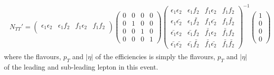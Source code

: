 \begin{align}
\begin{split}
N_{TT}'
=
\left( \begin{array}{cccc}
\epsilon_1 \epsilon_2 & \epsilon_1 f_2 & f_1 \epsilon_2 & f_1 f_2 \\
\end{array} \right)
\left( \begin{array}{cccc}
0 & 0 & 0 & 0 \\
0 & 1 & 0 & 0 \\
0 & 0 & 1 & 0 \\
0 & 0 & 0 & 1
\end{array} \right)
\left( \begin{array}{cccc}
\epsilon_1 \epsilon_2 & \epsilon_1 f_2 & f_1 \epsilon_2 & f_1 f_2 \\
\epsilon_1 \bar{\epsilon_2} & \epsilon_1 \bar{f_2} & f_1 \bar{\epsilon_2} & f_1 \bar{f_2} \\
\bar{\epsilon_1} \epsilon_2 & \bar{\epsilon_1} f_2 & \bar{f_1} \epsilon_2 & \bar{f_1} f_2 \\
\bar{\epsilon_1} \bar{\epsilon_2} & \bar{\epsilon_1} \bar{f_2} & \bar{f_1} \bar{\epsilon_2} & \bar{f_1} \bar{f_2}
\end{array} \right)^{-1}
\left( \begin{array}{c}
1 \\
0 \\
0 \\
0
\end{array} \right)
\end{split}
\label{equ:fake_eff_fake_weight}
\end{align}
where the flavours, $p_T$ and $|\eta|$ of the efficiencies is simply the flavours, $p_T$ and $|\eta|$ of the leading and sub-leading lepton in this event.

